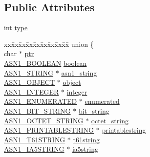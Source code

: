 \subsection*{Public Attributes}
\begin{DoxyCompactItemize}
\item 
int \hyperlink{structasn1__type__st_af1bd6ef16c406f3cd3fa67eb81693b54}{type}
\item 
\begin{tabbing}
xx\=xx\=xx\=xx\=xx\=xx\=xx\=xx\=xx\=\kill
union \{\\
\>char $\ast$ \hyperlink{structasn1__type__st_ab01ca089818d53090a87858244823952}{ptr}\\
\>\hyperlink{ossl__typ_8h_abab3d5c6a3b9e049d27737dc227c0849}{ASN1\_BOOLEAN} \hyperlink{structasn1__type__st_afa608ecee2b7dd25bf24eb05bdbd5e8e}{boolean}\\
\>\hyperlink{ossl__typ_8h_ad37610875e38aa6c59f5e6e0b437e65c}{ASN1\_STRING} $\ast$ \hyperlink{structasn1__type__st_a3890de753114f7d75a67a8fa8c0fdcdd}{asn1\_string}\\
\>\hyperlink{asn1_8h_ae10c08e4e6b23f67a39b2add932ec48f}{ASN1\_OBJECT} $\ast$ \hyperlink{structasn1__type__st_ae0224b286ce46464d0a29ae865932c9d}{object}\\
\>\hyperlink{ossl__typ_8h_af4335399bf9774cb410a5e93de65998b}{ASN1\_INTEGER} $\ast$ \hyperlink{structasn1__type__st_af3e81cd98de8af61de506d41b37b2a73}{integer}\\
\>\hyperlink{ossl__typ_8h_a4b87b1c33899eb49377f298e8a8b9850}{ASN1\_ENUMERATED} $\ast$ \hyperlink{structasn1__type__st_af82dd4c15d57d9b1ad8b5d73d1a88564}{enumerated}\\
\>\hyperlink{ossl__typ_8h_af837aaa00e151b1e8773aea5a8fe1cc4}{ASN1\_BIT\_STRING} $\ast$ \hyperlink{structasn1__type__st_a9e81befba02e1302af3bd0045a6c3675}{bit\_string}\\
\>\hyperlink{ossl__typ_8h_afbd05e94e0f0430a2b729473efec88c1}{ASN1\_OCTET\_STRING} $\ast$ \hyperlink{structasn1__type__st_a57c398f62f5af3ca6a9130b651d7bca6}{octet\_string}\\
\>\hyperlink{ossl__typ_8h_a0d7a94b1f271c071ca99ad8ea0a8907b}{ASN1\_PRINTABLESTRING} $\ast$ \hyperlink{structasn1__type__st_a4c897b38099d1e44ec582f7cfae436ff}{printablestring}\\
\>\hyperlink{ossl__typ_8h_a222d8715184df2c8c41745c6dda0df72}{ASN1\_T61STRING} $\ast$ \hyperlink{structasn1__type__st_a9c15c64e27b3ee47e277f3309d84e47d}{t61string}\\
\>\hyperlink{ossl__typ_8h_a0d915c339a64c1c9871d5404e51c44fd}{ASN1\_IA5STRING} $\ast$ \hyperlink{structasn1__type__st_af65bbee9242d7143a65a321437a7de74}{ia5string}\\

\end{tabbing}
\end{DoxyCompactItemize}
